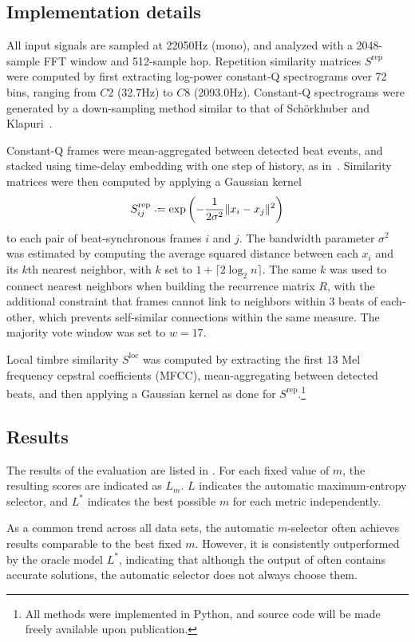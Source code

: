 \documentclass{article}
\begin{document}
\subsection{Implementation details}
All input signals are sampled at 22050Hz (mono), and analyzed with a 2048-sample FFT window
and 512-sample hop.  Repetition similarity matrices $S^\text{rep}$ were 
computed by first extracting log-power constant-Q spectrograms over 72 bins, ranging 
from $C2$ (32.7Hz) to $C8$ (2093.0Hz). Constant-Q spectrograms were generated by a 
down-sampling method similar to that of Sch{\"o}rkhuber and 
Klapuri~\cite{schorkhuber2010constant}.  

Constant-Q frames were mean-aggregated between detected beat events, and stacked using 
time-delay embedding with one step of history, as in~\cite{serra2014unsupervised}.
Similarity matrices were then computed by applying a Gaussian kernel
\[
S^\text{rep}_{ij} \defeq \exp\left(-\frac{1}{2\sigma^2}\|x_i - x_j\|^2\right)
\]
to each pair of beat-synchronous frames $i$ and $j$.
The bandwidth parameter $\sigma^2$ was estimated by computing the average 
squared distance between each $x_i$ and its $k$th nearest neighbor, with 
$k$ set to $1 + \lceil 2\log_2 n\rceil$.  The same $k$ was used to connect nearest
neighbors when building the recurrence matrix $R$, with the additional constraint that
frames cannot link to neighbors within 3 beats of each-other, which prevents
self-similar connections within the same measure. The majority vote window was set to
$w=17$.

Local timbre similarity $S^\text{loc}$ was computed by extracting the first 13 Mel
frequency cepstral coefficients (MFCC), mean-aggregating between detected beats, and
then applying a Gaussian kernel as done for $S^\text{rep}$.\footnote{All methods were implemented in Python, and source code will be made freely available upon publication.}

\subsection{Results}
The results of the evaluation are listed in
.  For each fixed value
of $m$, the resulting scores are indicated as $L_m$.  $L$ indicates the automatic
maximum-entropy selector, and $L^*$ indicates the best possible $m$ for each metric
independently.

As a common trend across all data sets, the automatic $m$-selector often achieves results
comparable to the best fixed $m$.  However, it is consistently outperformed by the 
oracle model $L^*$, indicating that although the output of  often contains 
accurate solutions, the automatic selector does not always choose them.
\end{document}
